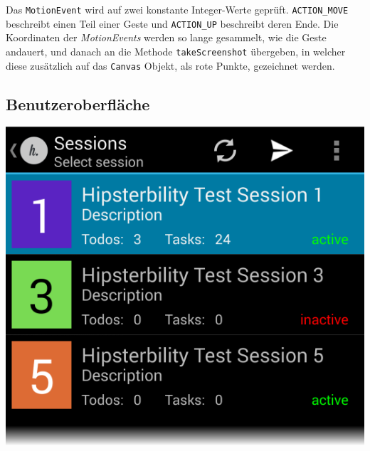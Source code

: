 Das \texttt{MotionEvent} wird auf zwei konstante Integer-Werte geprüft. 
\texttt{ACTION\_MOVE} beschreibt einen Teil einer Geste und \texttt{ACTION\_UP} beschreibt deren Ende.
Die Koordinaten der \emph{MotionEvents} werden so lange gesammelt, wie die Geste andauert, und danach an die Methode \texttt{takeScreenshot} übergeben, in welcher diese zusätzlich auf das \texttt{Canvas} Objekt, als rote Punkte,  gezeichnet werden.



\subsection{Benutzeroberfläche}
\begin{minipage}[t]{0.45\linewidth}
	\centering
	\includegraphics[width=\linewidth]{img/screen_session_list}
	 \label{fig:screen_sessions}
\end{minipage}
\hfill
